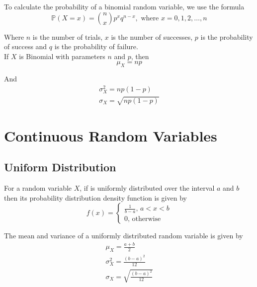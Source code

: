 \documentclass[12pt letter]{report}
\begin{document}

To calculate the probability of a binomial random variable, we use the formula
\[
	\mathbb{P} \left( X = x \right) = \binom{n}{x} p^x q^{n-x}, \text{ where } x = 0, 1, 2, \ldots, n
\]

Where $n$ is the number of trials, $x$ is the number of successes, $p$ is the probability of success and $q$ is the
probability of failure. \\

If $X$ is Binomial with parameters $n$ and $p$, then
\[
	\mu_{X} = np
\]

And
\begin{align*}
	\sigma^2_{X} = np \left( 1 - p \right) \\
	\sigma_{X} = \sqrt{np \left( 1 - p \right) }
\end{align*}

\section{Continuous Random Variables}


\subsection{Uniform Distribution}


For a random variable $X$, if is uniformly distributed over the interval $a$ and $b$ then its probability distribution
density function is given by
\[
	f \left( x \right)  = \begin{cases}
		\frac{1}{b - a}, \, a < x < b \\
		0, \, \text{otherwise}
	\end{cases}
\]

The mean and variance of a uniformly distributed random variable is given by
\begin{align*}
	\mu_X = \frac{a + b}{2}                         \\
	\sigma^2_X = \frac{\left( b - a \right)^2 }{12} \\
	\sigma_X = \sqrt{\frac{\left( b - a \right)^2 }{12}}
\end{align*}
\end{document}
